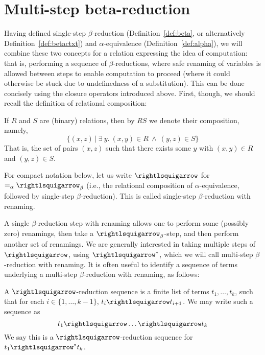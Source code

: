 \section{Multi-step beta-reduction}
\label{sec:multibeta}

Having defined single-step $\beta$-reduction
(Definition~\ref{def:beta}, or alternatively
Definition~\ref{def:betactxt}) and $\alpha$-equivalence
(Definition~\ref{def:alpha}), we will combine these two concepts for a
relation expressing the idea of computation: that is, performing a
sequence of $\beta$-reductions, where safe renaming of variables is
allowed between steps to enable computation to proceed (where it could
otherwise be stuck due to undefinedness of a substitution).  This can
be done concisely using the closure operators introduced above.
First, though, we should recall the definition of relational
composition:

\begin{definition}
  If $R$ and $S$ are (binary) relations, then by $R S$ we denote their
  composition, namely,
  \[
  \{ (x,z)\ |\ \exists\ y.\ (x,y)\in R \ \wedge\ (y,z) \in S \}
  \]
  \noindent That is, the set of pairs $(x,z)$ such that there exists some $y$ with
  $(x,y) \in R$ and $(y,z)\in S$.
\end{definition}

\begin{definition}
\label{def:betaa}
  For compact notation below, let us write $\betaa$ for $=_\alpha \betar$
  (i.e., the relational composition of
$\alpha$-equivalence, followed by single-step $\beta$-reduction).  This is called single-step
$\beta$-reduction with renaming.\index{$\betaa$}
\end{definition}

A single $\beta$-reduction step with renaming allows one to perform some (possibly zero)
renamings, then take a $\betar$-step, and then perform another set of renamings.
We are generally interested in taking multiple steps of $\betaa$, using $\betaa^*$, which
we will call multi-step $\beta$-reduction with renaming.
It is often useful to identify a sequence of terms underlying a
multi-step $\beta$-reduction with renaming, as follows:

\begin{definition}
\label{def:betars}
  A $\betaa$-reduction sequence is a finite list of terms
  $t_1,\ldots,t_k$, such that for each $i\in\{1,\ldots,k-1\}$,
  $t_i \betaa t_{i+1}$.  We may write such
  a sequence as
  \[
  t_1 \betaa \ldots \betaa t_k
  \]
  We say this is a $\betaa$-reduction sequence for $t_1\betaa^* t_k$.
\end{definition}


